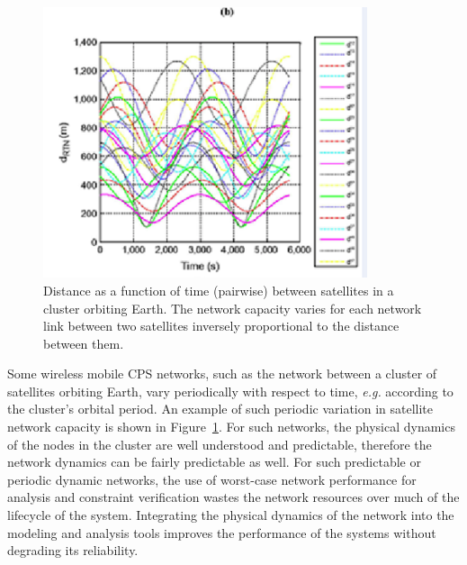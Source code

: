\begin{figure}[ht!]
  \centering
  \includegraphics[width=0.85\textwidth]{figs/satellite_network.png}
  \caption{Distance as a function of time (pairwise) between
    satellites in a cluster orbiting Earth.  The network capacity
    varies for each network link between two satellites inversely
    proportional to the distance between them.}
  \label{fig:satellite_network}
\end{figure}

Some wireless mobile CPS networks, such as the network between a
cluster of satellites orbiting Earth, vary periodically with respect
to time, \emph{e.g.} according to the cluster's orbital period.  An
example of such periodic variation in satellite network capacity is
shown in Figure~\ref{fig:satellite_network}.  For such networks, the
physical dynamics of the nodes in the cluster are well understood and
predictable, therefore the network dynamics can be fairly predictable
as well.  For such predictable or periodic dynamic networks, the use
of worst-case network performance for analysis and constraint
verification wastes the network resources over much of the lifecycle
of the system. Integrating the physical dynamics of the network into
the modeling and analysis tools improves the performance of the
systems without degrading its reliability.

